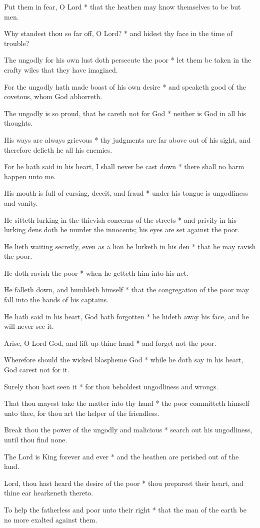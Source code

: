 Put them in fear, O Lord * that the heathen may know themselves to be but men.

Why standest thou so far off, O Lord? * and hidest thy face in the time of trouble?

The ungodly for his own lust doth persecute the poor * let them be taken in the crafty wiles that they have imagined.

For the ungodly hath made boast of his own desire * and speaketh good of the covetous, whom God abhorreth.

The ungodly is so proud, that he careth not for God * neither is God in all his thoughts.

His ways are always grievous * thy judgments are far above out of his sight, and therefore defieth he all his enemies.

For he hath said in his heart, I shall never be cast down * there shall no harm happen unto me.

His mouth is full of cursing, deceit, and fraud * under his tongue is ungodliness and vanity.

He sitteth lurking in the thievish concerns of the streets * and privily in his lurking dens doth he murder the innocents; his eyes are set against the poor.

He lieth waiting secretly, even as a lion he lurketh in his den * that he may ravish the poor.

He doth ravish the poor * when he getteth him into his net.

He falleth down, and humbleth himself * that the congregation of the poor may fall into the hands of his captains.

He hath said in his heart, God hath forgotten * he hideth away his face, and he will never see it.

Arise, O Lord God, and lift up thine hand * and forget not the poor.

Wherefore should the wicked blaspheme God * while he doth say in his heart, God carest not for it.

Surely thou hast seen it * for thou beholdest ungodliness and wrongs.

That thou mayest take the matter into thy hand * the poor committeth himself unto thee, for thou art the helper of the friendless.

Break thou the power of the ungodly and malicious * search out his ungodliness, until thou find none.

The Lord is King forever and ever * and the heathen are perished out of the land.

Lord, thou hast heard the desire of the poor * thou preparest their heart, and thine ear hearkeneth thereto.

To help the fatherless and poor unto their right * that the man of the earth be no more exalted against them.